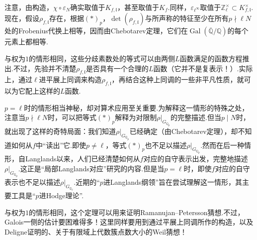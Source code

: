 \begin{remark*}[关于行列式]

注意，由构造，$\chi\circ\varepsilon_N$确实取值于$K_{f,\mathfrak l}$，甚至取值于$K_f$.同样，$\varepsilon_{\ell^\infty}$取值于$\mathbb Z_\ell^\times\subset K_{f,\mathfrak l}^\times$.现在，假设$\rho_{f,\mathfrak l}$存在，根据$(*)_p$，$\det(\rho_{f,\mathfrak l})$与所声称的特征至少在所有$p\nmid\ell N$处的Frobenius代换上相等，因而由Chebotarev定理，它们在$\operatorname{Gal}(\overline{\mathbb Q}/\mathbb Q)$的每个元素上都相等.

\end{remark*}

\begin{remark*}

与权为$1$的情形相同，这些分歧素数处的等式可以由两侧$L$函数满足的函数方程推出.不过，先验并不清楚$\rho_{f,\mathfrak l}$是否具有一个合理的$L$函数（它并不是复表示！）.实际上，通过$\ell$进平展上同调来构造$\rho_{f,\mathfrak l}$，再结合这种上同调的一些非平凡性质，就可以为它配上这样的$L$函数.

\end{remark*}

\begin{remark*}[$p=\ell$时如何？]

$p=\ell$时的情形相当神秘，却对算术应用至关重要.为解释这一情形的特殊之处，注意当$p\nmid\ell N$时，可以把等式$(*)_p$解释为对限制$\rho|_{G_{\mathbb Q_p}}$的完整描述.但当$p\mid N$时，就出现了这样的奇特局面：我们知道$\rho|_{G_{\mathbb Q_p}}$已经确定（由Chebotarev定理），却不知道如何从$f$中``读出''它.即使$p\ne\ell$，等式$(*)_p$也不足以描述$\rho|_{G_{\mathbb Q_p}}$.然而在后一种情形，自Langlands以来，人们已经清楚如何从$f$对应的自守表示出发，完整地描述$\rho|_{G_{\mathbb Q_p}}$.这正是``局部Langlands对应''研究的内容.但是当$p=\ell$时，即使$f$对应的自守表示也不足以描述$\rho|_{G_{\mathbb Q_\ell}}$.近期的``$p$进Langlands纲领''旨在尝试理解这一情形，其主要工具是``$p$进Hodge理论''.

\end{remark*}

\begin{remark*}[关于定理的推论]

与权为$1$的情形相同，这个定理可以用来证明Ramanujan--Petersson猜想.不过，Galois一侧的估计要困难得多！这里同样要用到通过平展上同调所作的构造，以及Deligne证明的、关于有限域上代数簇点数大小的Weil猜想！

\end{remark*}

